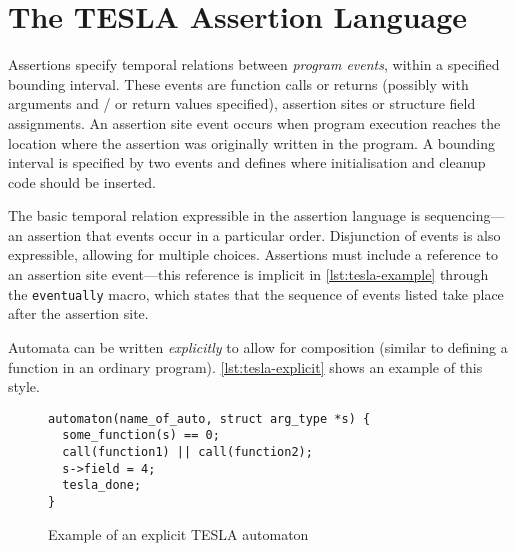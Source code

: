 \section{The TESLA Assertion Language} \label{sec:assertions}

Assertions specify temporal relations between \emph{program events},
within a specified bounding interval. These events are function calls or
returns (possibly with arguments and / or return values specified),
assertion sites or structure field assignments. An assertion site event
occurs when program execution reaches the location where the assertion
was originally written in the program. A bounding interval is specified
by two events and defines where initialisation and cleanup code should
be inserted.

The basic temporal relation expressible in the assertion language is
sequencing---an assertion that events occur in a particular order.
Disjunction of events is also expressible, allowing for multiple
choices. Assertions must include a reference to an assertion site
event---this reference is implicit in \autoref{lst:tesla-example}
through the \texttt{eventually} macro, which states that the
sequence of events listed take place after the assertion site.

Automata can be written \emph{explicitly} to allow for composition
(similar to defining a function in an ordinary program).
\autoref{lst:tesla-explicit} shows an example of this style.

\begin{figure}
  \begin{verbatim}
automaton(name_of_auto, struct arg_type *s) {
  some_function(s) == 0;
  call(function1) || call(function2);
  s->field = 4;
  tesla_done;
}
  \end{verbatim}
  \caption{Example of an explicit TESLA automaton}
  \label{lst:tesla-explicit}
\end{figure}
